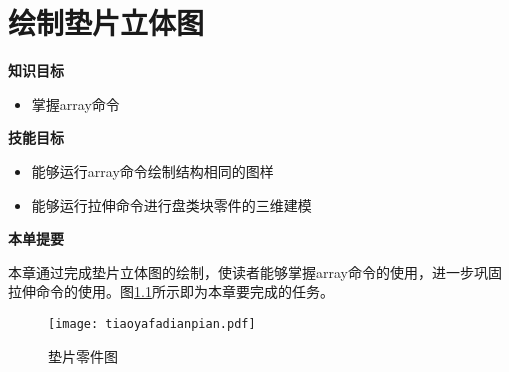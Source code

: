 \chapter{绘制垫片立体图}\label{chap:dianpian}
{\bfseries 知识目标}
\begin{itemize}
\item 掌握array命令
\end{itemize}

{\bfseries 技能目标}
\begin{itemize}
\item 能够运行array命令绘制结构相同的图样
\item 能够运行拉伸命令进行盘类块零件的三维建模
\end{itemize}

{\bfseries 本单提要}

本章通过完成垫片立体图的绘制，使读者能够掌握array命令的使用，进一步巩固拉伸命令的使用。图\ref{fig:tiaoyafadianpian}所示即为本章要完成的任务。
\noindent
\begin{figure}[htbp]
\centering
\texttt{[image: tiaoyafadianpian.pdf]}
\caption{垫片零件图}\label{fig:tiaoyafadianpian}
\end{figure}

\endinput